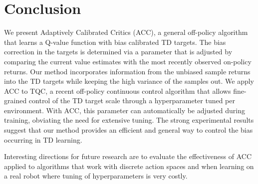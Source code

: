 \section{Conclusion}

We present Adaptively Calibrated Critics (ACC), a general off-policy algorithm that learns a Q-value function with bias calibrated TD targets. 
The bias correction in the targets is determined via a parameter that is adjusted by comparing the current value estimates with the most recently observed on-policy returns.
Our method incorporates information from the unbiased sample returns into the TD targets while keeping the high variance of the samples out. We apply ACC to TQC, a recent off-policy continuous control algorithm that allows fine-grained control of the TD target scale through a hyperparameter tuned per environment.
With ACC, this parameter can automatically be adjusted during training,  obviating the need for extensive tuning.
The strong experimental results suggest that our method provides an efficient and general way to control the bias occurring in TD learning. 

Interesting directions for future research are to evaluate the effectiveness of ACC applied to algorithms that work with discrete action spaces and when learning on a real robot where tuning of hyperparameters is very costly. 







